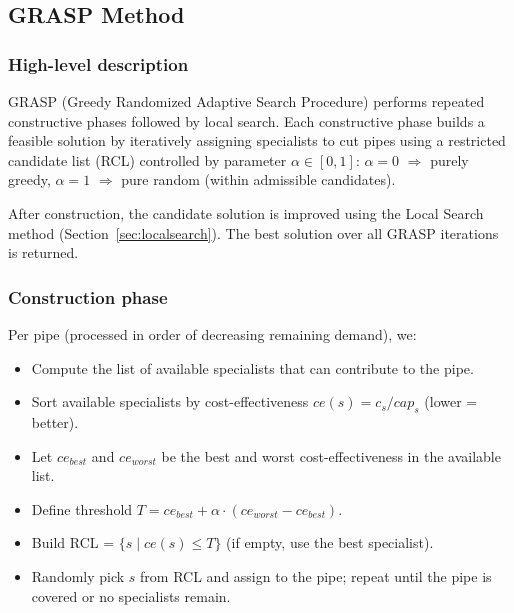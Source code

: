 \documentclass{article}
\begin{document}


\subsection{GRASP Method}

\subsubsection{High-level description}
GRASP (Greedy Randomized Adaptive Search Procedure) performs repeated constructive phases followed by local search. Each constructive phase builds a feasible solution by iteratively assigning specialists to cut pipes using a restricted candidate list (RCL) controlled by parameter $\alpha \in [0,1]$: $\alpha = 0$ $\Rightarrow$ purely greedy, $\alpha = 1$ $\Rightarrow$ pure random (within admissible candidates).

After construction, the candidate solution is improved using the Local Search method (Section~\ref{sec:localsearch}). The best solution over all GRASP iterations is returned.

\subsubsection{Construction phase}
Per pipe (processed in order of decreasing remaining demand), we:

\begin{itemize}
    \item Compute the list of available specialists that can contribute to the pipe.
    \item Sort available specialists by cost-effectiveness $ce(s) = c_s / cap_s$ (lower = better).
    \item Let $ce_{best}$ and $ce_{worst}$ be the best and worst cost-effectiveness in the available list.
    \item Define threshold $T = ce_{best} + \alpha \cdot (ce_{worst} - ce_{best})$.
    \item Build RCL = $\{ s \mid ce(s) \le T \}$ (if empty, use the best specialist).
    \item Randomly pick $s$ from RCL and assign to the pipe; repeat until the pipe is covered or no specialists remain.
\end{itemize}
\end{document}
